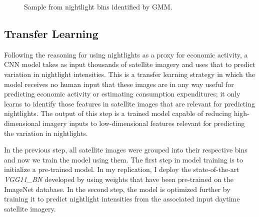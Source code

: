 \documentclass[11pt, a4paper, leqno]{article}
\begin{document}
\begin{figure}%
    \centering
    \qquad
    \caption{Sample from nightlight bins identified by GMM.}%
    \label{img_light}%
\end{figure}

\subsection{Transfer Learning}

Following the reasoning for using nightlights as a proxy for economic activity, a CNN model takes as input thousands of satellite imagery and uses that to predict variation in nightlight intensities. This is a transfer learning strategy in which the model receives no human input that these images are in any way useful for predicting economic activity or estimating consumption expenditures; it only learns to identify those features in satellite images that are relevant for predicting nightlights. The output of this step is a trained model capable of reducing high-dimensional imagery inputs to low-dimensional features relevant for predicting the variation in nightlights.

In the previous step, all satellite images were grouped into their respective bins and now we train the model using them. The first step in model training is to initialize a pre-trained model. In my replication, I deploy the state-of-the-art \textit{VGG11\_BN} developed by \citet{simonyan2014very} using weights that have been pre-trained on the ImageNet database. In the second step, the model is optimized further by training it to predict nightlight intensities from the associated input daytime satellite imagery.
\end{document}
